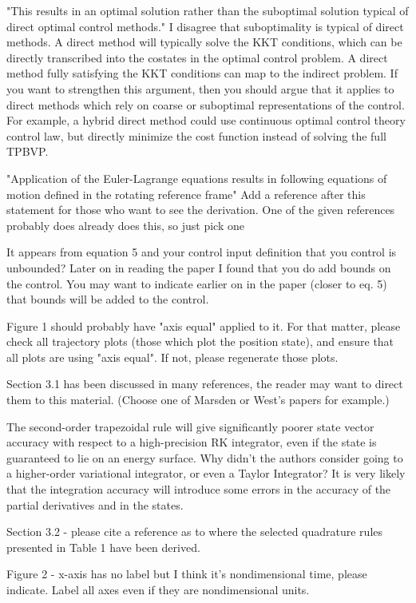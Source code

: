 \documentclass[11pt]{article}
\begin{document}
\begin{enumerate}
"This results in an optimal solution rather than the suboptimal solution typical of direct optimal control methods." I disagree that suboptimality is typical of direct methods.  A direct method will typically solve the KKT conditions, which can be directly transcribed into the costates in the optimal control problem.  A direct method fully satisfying the KKT conditions can map to the indirect problem. If you want to strengthen this argument, then you should argue that it applies to direct methods which rely on coarse or suboptimal representations of the control.  For example, a hybrid direct method could use continuous optimal control theory control law, but directly minimize the cost function instead of solving the full TPBVP.  

"Application of the Euler-Lagrange equations results in following equations of motion defined in the rotating reference frame"  Add a reference after this statement for those who want to see the derivation.  One of the given references probably does already does this, so just pick one

It appears from equation 5 and your control input definition that you control is unbounded?  Later on in reading the paper I found that you do add bounds on the control.  You may want to indicate earlier on in the paper (closer to eq. 5) that bounds will be added to the control.

Figure 1 should probably have "axis equal" applied to it.  For that matter, please check all trajectory plots (those which plot the position state), and ensure that all plots are using "axis equal".  If not, please regenerate those plots. 

Section 3.1 has been discussed in many references, the reader may want to direct them to this material.
(Choose one of Marsden or West's papers for example.)

The second-order trapezoidal rule will give significantly poorer state vector accuracy with respect to a high-precision RK integrator, even if the state is guaranteed to lie on an energy surface.  Why didn't the authors consider going to a higher-order variational integrator, or even a Taylor Integrator?  It is very likely that the integration accuracy will introduce some errors in the accuracy of the partial derivatives and in the states.

Section 3.2 - please cite a reference as to where the selected quadrature rules presented in Table 1 have been derived.

Figure 2 - x-axis has no label but I think it's nondimensional time, please indicate.  Label all axes even if they are nondimensional units.


\end{enumerate}
\end{document}

